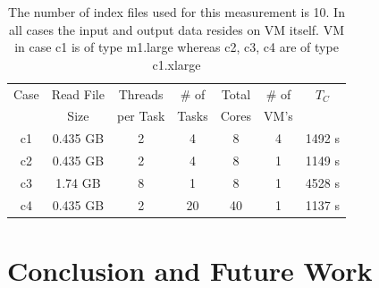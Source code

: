 \documentclass{acm_proc_article-sp}
\begin{document}


 \begin{table}
 \small
 \begin{tabular}{|c|c|c|c|c|c|c|} 
 \hline 
 Case&Read File&Threads  & \# of & Total & \# of  &  $T_C$  \\ 
     & Size  & per Task & Tasks & Cores &  VM's & \\ 
\hline

c1& 0.435 GB&2 &  4 & 8 & 4 & 1492 s\\
c2 &0.435 GB & 2 & 4  & 8  & 1 &1149 s\\ 
c3 & 1.74 GB &8 & 1 &  8 & 1 &4528 s \\\hline
\hline
c4 & 0.435 GB&2 & 20 & 40 & 1 &1137 s \\
\hline

 \end{tabular}

 \caption{ The number of index files used for this measurement is 10.
   In all cases the input and output data resides on VM itself.  VM in
   case c1 is of type m1.large whereas c2, c3, c4 are of type
   c1.xlarge }
  \label{table:cloud-VM} 
\end{table}



\section{Conclusion and Future Work}
\end{document}

